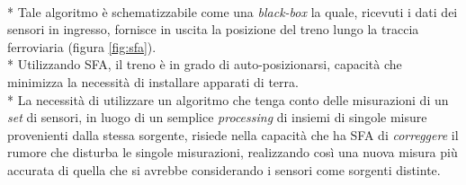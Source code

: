 \\*
Tale algoritmo \`e schematizzabile come una \emph{black-box} la quale, ricevuti i dati dei sensori in ingresso, fornisce in uscita la posizione del treno lungo la traccia ferroviaria (figura \ref{fig:sfa}).\\*
Utilizzando SFA, il treno \`e in grado di auto-posizionarsi, capacit\`a che minimizza la necessit\`a di installare apparati di terra.\\*
La necessit\`a di utilizzare un algoritmo che tenga conto delle misurazioni di un \emph{set} di sensori, in luogo di un semplice \emph{processing} di insiemi di singole misure provenienti dalla stessa sorgente, risiede nella capacit\`a che ha SFA di \emph{correggere} il rumore che disturba le singole misurazioni, realizzando cos\`i una nuova misura pi\`u accurata di quella che si avrebbe considerando i sensori come sorgenti distinte.